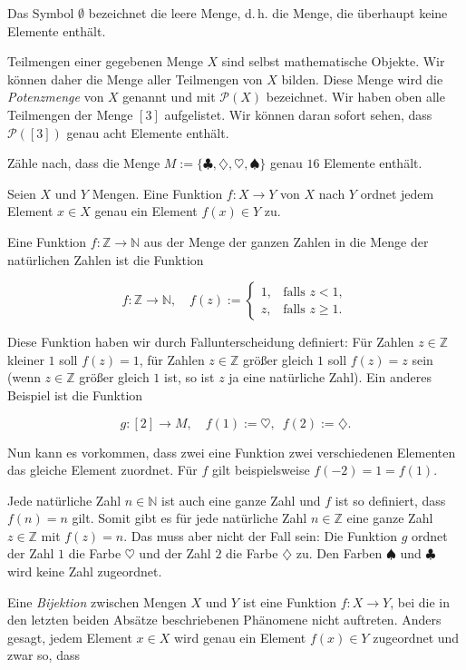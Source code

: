 \documentclass{uebungszettel}
\newcommand{\N}{\mathbb{N}} %
\newcommand{\Z}{\mathbb{Z}}
\begin{document}
Das Symbol $\emptyset$ bezeichnet die leere Menge, d.\,h. die Menge, die überhaupt keine Elemente enthält.

Teilmengen einer gegebenen Menge $X$ sind selbst mathematische Objekte. Wir können daher die Menge aller Teilmengen von $X$ bilden. Diese Menge wird die \emph{Potenzmenge} von $X$ genannt und mit $\mathcal{P}(X)$ bezeichnet. Wir haben oben alle Teilmengen der Menge $[3]$ aufgelistet. Wir können daran sofort sehen, dass $\mathcal{P}([3])$ genau acht Elemente enthält.

\begin{aufgabe}{}
  Zähle nach, dass die Menge $M := \{ \clubsuit, \diamondsuit, \heartsuit, \spadesuit \}$ genau $16$ Elemente enthält.
\end{aufgabe}

Seien $X$ und $Y$ Mengen. Eine Funktion $f : X \to Y$ von $X$ nach $Y$ ordnet jedem Element $x \in X$ genau ein Element $f(x) \in Y$ zu.

Eine Funktion $f : \Z \to \N$ aus der Menge der ganzen Zahlen in die Menge der natürlichen Zahlen ist die Funktion

\[
  f : \Z \to \N, \quad f(z) := \begin{cases}
    1, & \text{falls } z < 1, \\
    z, & \text{falls } z \geq 1.
  \end{cases}
\]

Diese Funktion haben wir durch Fallunterscheidung definiert: Für Zahlen $z \in \Z$ kleiner $1$ soll $f(z) = 1$, für Zahlen $z \in \Z$ größer gleich $1$ soll $f(z) = z$ sein (wenn $z \in \Z$ größer gleich $1$ ist, so ist $z$ ja eine natürliche Zahl).
Ein anderes Beispiel ist die Funktion

\[
  g : [2] \to M, \quad f(1) := \heartsuit, \enspace f(2) := \diamondsuit.
\]

Nun kann es vorkommen, dass zwei eine Funktion zwei verschiedenen Elementen das gleiche Element zuordnet. Für $f$ gilt beispielsweise $f(-2) = 1 = f(1)$.

Jede natürliche Zahl $n \in \N$ ist auch eine ganze Zahl und $f$ ist so definiert, dass $f(n) = n$ gilt. Somit gibt es für jede natürliche Zahl $n \in \Z$ eine ganze Zahl $z \in \Z$ mit $f(z) = n$. Das muss aber nicht der Fall sein: Die Funktion $g$ ordnet der Zahl $1$ die Farbe $\heartsuit$ und der Zahl $2$ die Farbe $\diamondsuit$ zu. Den Farben $\spadesuit$ und $\clubsuit$ wird keine Zahl zugeordnet.

Eine \emph{Bijektion} zwischen Mengen $X$ und $Y$ ist eine Funktion $f : X \to Y$, bei die in den letzten beiden Absätze beschriebenen Phänomene nicht auftreten. Anders gesagt, jedem Element $x \in X$ wird genau ein Element $f(x) \in Y$ zugeordnet und zwar so, dass
\end{document}
